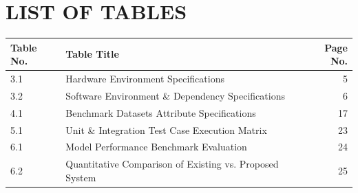 \documentclass[12pt,a4paper]{report}
\begin{document}
\newpage
\chapter*{LIST OF TABLES}
\begin{tabular}{llr}
\textbf{Table No.} & \textbf{Table Title} & \textbf{Page No.} \\
\midrule
3.1 & Hardware Environment Specifications & 5 \\
3.2 & Software Environment \& Dependency Specifications & 6 \\
4.1 & Benchmark Datasets Attribute Specifications & 17 \\
5.1 & Unit \& Integration Test Case Execution Matrix & 23 \\
6.1 & Model Performance Benchmark Evaluation & 24 \\
6.2 & Quantitative Comparison of Existing vs. Proposed System & 25 \\
\bottomrule
\end{tabular}

\newpage
\end{document}
